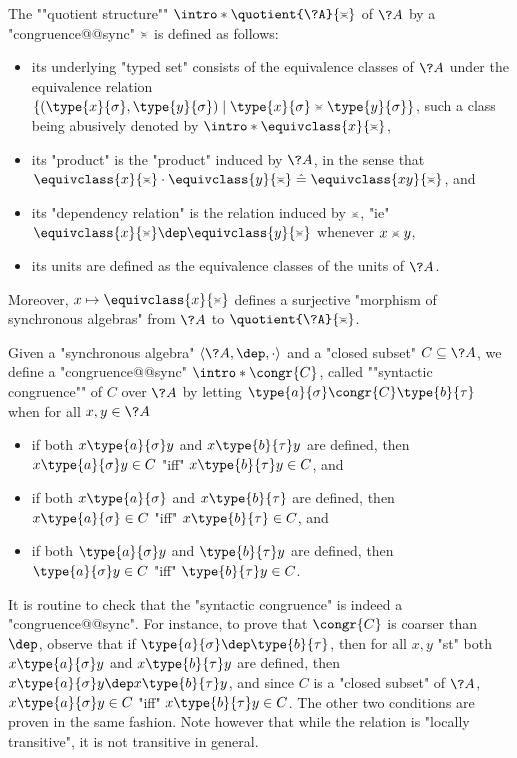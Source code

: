 The \AP""quotient structure"" $\intro*\quotient{\?A}{\asympbar}$
of $\?A$ by a "congruence@@sync" $\asympbar$ is defined as follows:
\begin{itemize}
	\item its underlying "typed set" consists of the
		equivalence classes of $\?A$ under the equivalence relation
		$\{(\type{x}{\sigma}, \type{y}{\sigma}) \mid \type{x}{\sigma} \asympbar \type{y}{\sigma}\}$,
		such a class being abusively denoted by \AP$\intro*\equivclass{x}{\asympbar}$,
	\item its "product" is the "product" induced by $\?A$, in the sense
		that $\equivclass{x}{\asympbar}\cdot \equivclass{y}{\asympbar} \defeq \equivclass{xy}{\asympbar}$, and
	\item its "dependency relation" is the relation induced by $\asympbar$,
		"ie" $\equivclass{x}{\asympbar}\dep \equivclass{y}{\asympbar}$ whenever $x \asympbar y$,
	\item its units are defined as the equivalence classes of the units of $\?A$.
\end{itemize}
Moreover, $x \mapsto \equivclass{x}{\asympbar}$ defines a surjective
"morphism of synchronous algebras" from $\?A$ to $\quotient{\?A}{\asympbar}$.

Given a "synchronous algebra" $\langle \?A, \dep, \cdot \rangle$
and a "closed subset" $C \subseteq \?A$, 
we define a "congruence@@sync" \AP$\intro*\congr{C}$, called
\AP""syntactic congruence"" of $C$ over $\?A$ by letting
$\type{a}{\sigma} \congr{C} \type{b}{\tau}$ when for all $x, y \in \?A$
\begin{itemize}
	\item if both
		$x \type{a}{\sigma} y$
		and $x \type{b}{\tau} y$ are defined,
		then $x \type{a}{\sigma} y \in C$
		"iff" $x \type{b}{\tau} y \in C$, and
	\item if both
		$x \type{a}{\sigma}$
		and $x \type{b}{\tau}$ are defined,
		then $x \type{a}{\sigma} \in C$
		"iff" $x \type{b}{\tau} \in C$, and
	\item if both $\type{a}{\sigma} y$
		and $\type{b}{\tau} y$ are defined,
		then $\type{a}{\sigma} y \in C$
		"iff" $\type{b}{\tau} y \in C$.
\end{itemize}
It is routine to check that the "syntactic congruence" is indeed a "congruence@@sync".
For instance, to prove that $\congr{C}$ is coarser than $\dep$, observe that
if $\type{a}{\sigma} \dep \type{b}{\tau}$, then
for all $x, y$ "st" both $x \type{a}{\sigma} y$
and $x \type{b}{\tau} y$ are defined, then $x \type{a}{\sigma} y \dep x \type{b}{\tau} y$,
and since $C$ is a "closed subset" of $\?A$, $x \type{a}{\sigma} y \in C$ "iff"
$x \type{b}{\tau} y \in C$. The other two conditions are proven in the same fashion.
Note however that while the relation is "locally transitive", it is not
transitive in general.

